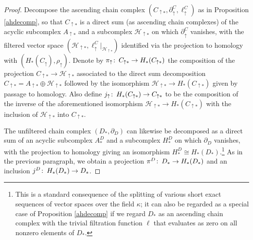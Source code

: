 \documentclass[11pt]{amsart}
\theoremstyle{definition}
\theoremstyle{remark}
\numberwithin{equation}{section}
\def\co{\colon\thinspace}
\begin{document}
\begin{proof}
	Decompose the ascending chain complex $(C_{\uparrow *},\partial_{\uparrow}^{C},\ell_{\uparrow}^{C})$ as in Proposition \ref{ahdecomp}, so that $C_{\uparrow *}$ is a direct sum (as ascending chain complexes) of the acyclic subcomplex $A_{\uparrow *}$ and a subcomplex $\mathcal{H}_{\uparrow *}$ on which $\partial_{\uparrow}^{C}$ vanishes, with the filtered vector space $(\mathcal{H}_{\uparrow *},\ell_{\uparrow}^{C}|_{\mathcal{H}_{\uparrow *}})$ identified via the projection to homology with $(H_*(C_{\uparrow}),\rho_{\uparrow})$.  Denote by $\pi_{\uparrow}\co C_{\uparrow *}\to H_*(C_{\uparrow *})$ the composition of the projection $C_{\uparrow *}\to \mathcal{H}_{\uparrow *}$ associated to the direct sum decomposition $C_{\uparrow *}=A_{\uparrow *}\oplus \mathcal{H}_{\uparrow *}$ followed by the isomorphism $\mathcal{H}_{\uparrow *}\to H_*(C_{\uparrow *})$ given by passage to homology. Also define $j_{\uparrow}\co H_{*}(C_{\uparrow *})\to C_{\uparrow *}$ to be the composition of the inverse of the aforementioned isomorphism $\mathcal{H}_{\uparrow *}\to H_*(C_{\uparrow *})$  with the inclusion of $\mathcal{H}_{\uparrow *}$ into $C_{\uparrow *}$.
	
	The unfiltered chain complex $(D_*,\partial_D)$ can likewise be decomposed as a direct sum of an acyclic subcomplex $A_*^{D}$ and a subcomplex $H_*^D$ on which $\partial_D$ vanishes, with the projection to homology giving an isomorphism $H_*^D\cong H_*(D_*)$.\footnote{This is a standard consequence of the splitting of various short exact sequences of vector spaces over the field $\kappa$; it can also be regarded as a special case of Proposition \ref{ahdecomp} if we regard $D_*$ as an ascending chain complex with the trivial filtration function $\ell$ that evaluates as zero on all nonzero elements of $D_*$.}  As in the previous paragraph, we obtain a projection $\pi^D\co D_*\to H_*(D_*)$ and an inclusion $j^D\co H_*(D_*)\to D_*$.  
	

\end{proof}
\end{document}
